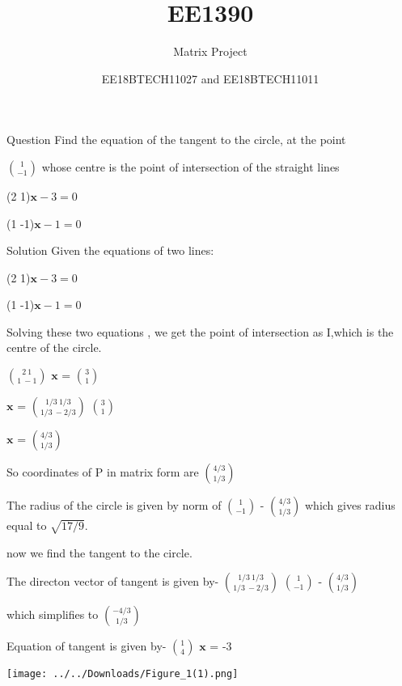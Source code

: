 \documentclass{beamer}
\title[]{EE1390}
\subtitle{Matrix Project}
\author{EE18BTECH11027 and EE18BTECH11011}
\date{}
\begin{document}
\begin{frame}
\titlepage
\end{frame}

\begin{frame}{Question}
Find the equation of the tangent to the circle,
at the point

\setlength{\parindent}{4cm}
$\binom{1}{-1}$
whose centre is the point of intersection of the
straight lines

\setlength{\parindent}{4cm} 
		(2 1)$\boldsymbol{x}-3=0$


		(1 -1)$\boldsymbol{x}-1=0$
		
\end{frame}		

\begin{frame}{Solution}
Given the equations of two lines:
\setlength{\parindent}{4cm}  

     
 (2 1)$\boldsymbol{x}-3=0$

		    (1 -1)$\boldsymbol{x}-1=0$
\setlength{\parindent}{0cm}

Solving these two equations , we get the point of intersection as I,which is the centre of the circle.
\vspace{2 mm}
\setlength{\parindent}{4cm}

$\binom{2 \ 1}{1  \  -1}$ $\boldsymbol{x}$ = $\binom{3}{1}$

\vspace{2 mm}
$\boldsymbol{x}$ =  $\binom{1/3 \  1/3}{1/3  \   -2/3}$ $\binom{3}{1}$

\vspace{2 mm}

$\boldsymbol{x}$ = $\binom{4/3}{1/3}$

\vspace{2 mm}
\setlength{\parindent}{0.5cm}

So coordinates of P in matrix form are $\binom{4/3}{1/3}$
\end{frame}


\begin{frame}


The radius of the circle is given by norm of $\binom{1}{-1}$ - 
$\binom{4/3}{1/3}$
which gives radius equal to $\sqrt{17/9}$.

now we find the tangent to the circle.

The directon vector of tangent is given by-
$\binom{1/3 \  1/3}{1/3  \   -2/3}$ $\binom{1}{-1}$ - 
$\binom{4/3}{1/3}$

which simplifies to $\binom{-4/3}{1/3}$


Equation of tangent is given by-
$\binom{1}{4}$ $\boldsymbol{x}$ = -3



\end{frame}
\begin{frame}
\texttt{[image: ../../Downloads/Figure\_1(1).png]}

\end{frame}
\end{document}
